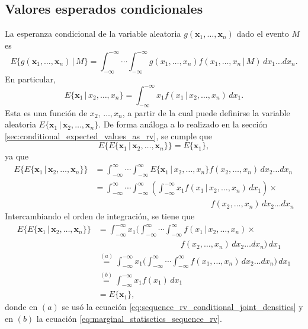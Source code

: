 \documentclass[a4paper]{report}
\newcommand{\x}{\mathbf{x}}
\begin{document}
\subsection{Valores esperados condicionales}\label{sec:conditional_expected_values_as_rv_sequence}

La esperanza condicional de la variable aleatoria \(g(\x_1,\dots,\x_n)\) dado el evento \(M\) es
\small
\[
 E\{g(\x_1,\dots,\x_n)\,|\,M\}=\int_{-\infty}^{-\infty}\cdots\int_{-\infty}^{-\infty}g(x_1,\dots,x_n)f(x_1,\dots,x_n\,|\,M)\,dx_1\dots dx_n.
\]
\normalsize
En particular,
\[
 E\{\x_1\,|\,x_2,\dots,x_n\}=\int_{-\infty}^{-\infty}x_1f(x_1\,|\,x_2,\dots,x_n)\,dx_1.
\]
Esta es una función de \(x_2,\,\dots,x_n\), a partir de la cual puede definirse la variable aleatoria \(E\{\x_1\,|\,\x_2,\dots,\x_n\}\). De forma análoga a lo realizado en la sección \ref{sec:conditional_expected_values_as_rv}, se cumple que
\[
 E\{E\{\x_1\,|\,\x_2,\dots,\x_n\}\}=E\{\x_1\},
\]
ya que
\begin{align*}
 E\{E\{\x_1\,|\,\x_2,\dots,\x_n\}\}&=\int_{-\infty}^\infty\cdots\int_{-\infty}^\infty E\{\x_1\,|\,x_2,\dots,x_n\}f(x_2,\dots,x_n)\,dx_2\dots dx_n\\
 &=\int_{-\infty}^\infty\cdots\int_{-\infty}^\infty \left(\int_{-\infty}^{-\infty}x_1f(x_1\,|\,x_2,\dots,x_n)\,dx_1\right)\times\\
 &\hspace{14em} f(x_2,\dots,x_n)\,dx_2\dots dx_n
\end{align*}
Intercambiando el orden de integración, se tiene que
\begin{align*}
 E\{E\{\x_1\,|\,\x_2,\dots,\x_n\}\}&=\int_{-\infty}^{-\infty}x_1\bigg(\int_{-\infty}^\infty\cdots\int_{-\infty}^\infty f(x_1\,|\,x_2,\dots,x_n)\times\\
 &\hspace{10em} f(x_2,\dots,x_n)\,dx_2\dots dx_n\bigg)\,dx_1\\
 &\overset{(a)}{=}\int_{-\infty}^{-\infty}x_1\bigg(\int_{-\infty}^\infty\cdots\int_{-\infty}^\infty f(x_1,\dots,x_n)\,dx_2\dots dx_n\bigg)\,dx_1\\
 &\overset{(b)}{=}\int_{-\infty}^{-\infty}x_1f(x_1)\,dx_1\\
 &=E\{\x_1\},
\end{align*}
donde en \((a)\) se usó la ecuación \ref{eq:sequence_rv_conditional_joint_densities} y en \((b)\) la ecuación \ref{eq:marginal_statisctics_sequence_rv}.
\end{document}
